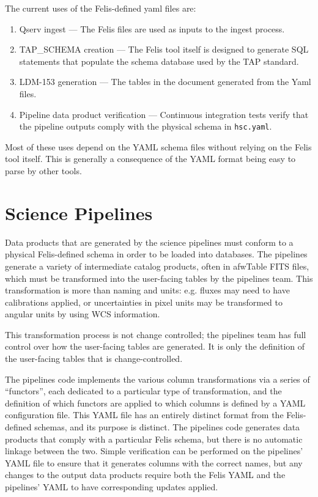 \documentclass[DM,authoryear,toc]{lsstdoc}
\begin{document}
The current uses of the Felis-defined yaml files are:
\begin{enumerate}
\item Qserv ingest --- The Felis files are used as inputs to the ingest process.

\item TAP\_SCHEMA creation --- The Felis tool itself is designed to generate SQL statements that
    populate the schema database used by the TAP standard.

\item LDM-153 generation --- The tables in the document generated from the Yaml files.

\item Pipeline data product verification --- Continuous integration tests verify that the pipeline
    outputs comply with the physical schema in \texttt{hsc.yaml}.
\end{enumerate}

Most of these uses depend on the YAML schema files without relying on the Felis tool itself. This is
generally a consequence of the YAML format being easy to parse by other tools.


\section{Science Pipelines}

Data products that are generated by the science pipelines must conform to a physical Felis-defined
schema in order to be loaded into databases. The pipelines generate a variety of intermediate
catalog products, often in afwTable FITS files, which must be transformed into the user-facing
tables by the pipelines team. This transformation is more than naming and units: e.g. fluxes may
need to have calibrations applied, or uncertainties in pixel units may be transformed to angular
units by using WCS information.

This transformation process is not change controlled; the pipelines team has full control over how
the user-facing tables are generated. It is only the definition of the user-facing tables that is
change-controlled.

The pipelines code implements the various column transformations via a series of ``functors'', each
dedicated to a particular type of transformation, and the definition of which functors are applied
to which columns is defined by a YAML configuration file. This YAML file has an entirely distinct
format from the Felis-defined schemas, and its purpose is distinct. The pipelines code generates
data products that comply with a particular Felis schema, but there is no automatic linkage between
the two. Simple verification can be performed on the pipelines' YAML file to ensure that it
generates columns with the correct names, but any changes to the output data products require both
the Felis YAML and the pipelines' YAML to have corresponding updates applied.
\end{document}
